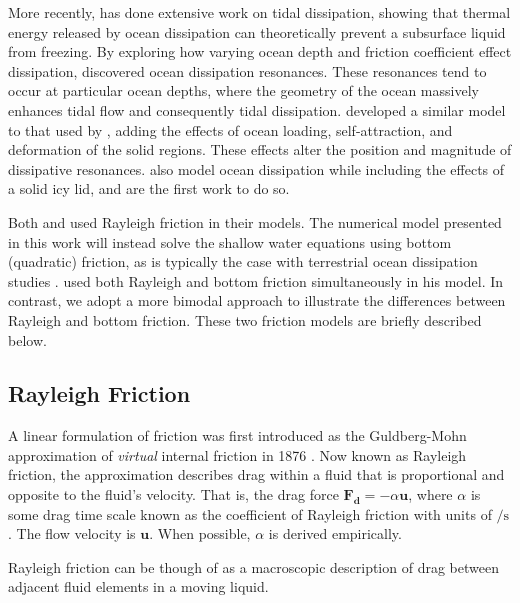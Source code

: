 More recently, \citet{tyler2008strong,tyler2009ocean,tyler2011tidal,tyler2014comparative} has done extensive work on tidal dissipation, showing that thermal energy released by ocean dissipation can theoretically prevent a subsurface liquid from freezing. By exploring how varying ocean depth and friction coefficient effect dissipation, \citet{tyler2011tidal} discovered ocean dissipation resonances. These resonances tend to occur at particular ocean depths, where the geometry of the ocean massively enhances tidal flow and consequently tidal dissipation. \citet{matsuyama2014tidal} developed a similar model to that used by \citet{tyler2011tidal}, adding the effects of ocean loading, self-attraction, and deformation of the solid regions. These effects alter the position and magnitude of dissipative resonances. \citet{kamata2015tidal} also model ocean dissipation while including the effects of a solid icy lid, and are the first work to do so.

Both \citet{tyler2011tidal} and \citet{matsuyama2014tidal} used Rayleigh friction in their models. The numerical model presented in this work will instead solve the shallow water equations using bottom (quadratic) friction, as is typically the case with terrestrial ocean dissipation studies \citep{taylor1920tidal,jeffreys1921tidal,zahel1977global,egbert2001estimates,jayne2001parameterizing}. \citet{sears1995tidal} used both Rayleigh and bottom friction simultaneously in his model. In contrast, we adopt a more bimodal approach to illustrate the differences between Rayleigh and bottom friction. These two friction models are briefly described below.

\subsection{Rayleigh Friction}

A linear formulation of friction was first introduced as the Guldberg-Mohn approximation of \textit{virtual} internal friction in 1876 \citep{neumann1968ocean}. Now known as Rayleigh friction, the approximation describes drag within a fluid that is proportional and opposite to the fluid's velocity. That is, the drag force $\bm{F_d} = -\alpha \bm{u}$, where $\alpha$ is some drag time scale known as the coefficient of Rayleigh friction with units of $\si{\per\second}$. The flow velocity is $\bm{u}$. When possible, $\alpha$ is derived empirically.

Rayleigh friction can be though of as a macroscopic description of drag between adjacent fluid elements in a moving liquid.

